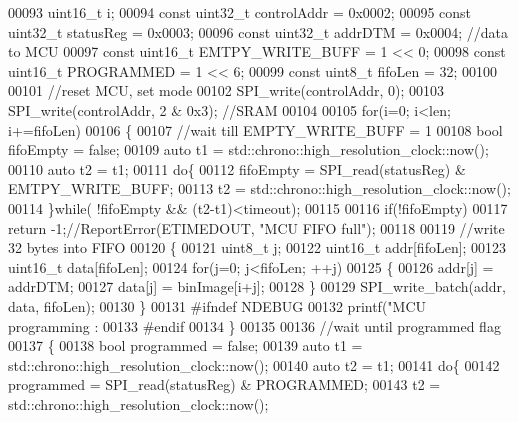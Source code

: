 \begin{DoxyCode}
{{{00093     uint16\_t i;
00094     \textcolor{keyword}{const} uint32\_t controlAddr = 0x0002;
00095     \textcolor{keyword}{const} uint32\_t statusReg = 0x0003;
00096     \textcolor{keyword}{const} uint32\_t addrDTM = 0x0004; \textcolor{comment}{//data to MCU}
00097     \textcolor{keyword}{const} uint16\_t EMTPY\_WRITE\_BUFF = 1 << 0;
00098     \textcolor{keyword}{const} uint16\_t PROGRAMMED = 1 << 6;
00099     \textcolor{keyword}{const} uint8\_t fifoLen = 32;
00100 
00101     \textcolor{comment}{//reset MCU, set mode}
00102     SPI_write(controlAddr, 0);
00103     SPI_write(controlAddr, 2 & 0x3); \textcolor{comment}{//SRAM}
00104 
00105     \textcolor{keywordflow}{for}(i=0; i<len; i+=fifoLen)
00106     \{
00107         \textcolor{comment}{//wait till EMPTY\_WRITE\_BUFF = 1}
00108         \textcolor{keywordtype}{bool} fifoEmpty = \textcolor{keyword}{false};
00109         \textcolor{keyword}{auto} t1 = std::chrono::high\_resolution\_clock::now();
00110         \textcolor{keyword}{auto} t2 = t1;
00111         \textcolor{keywordflow}{do}\{
00112             fifoEmpty = SPI_read(statusReg) & EMTPY\_WRITE\_BUFF;
00113             t2 = std::chrono::high\_resolution\_clock::now();
00114         \}\textcolor{keywordflow}{while}( !fifoEmpty && (t2-t1)<timeout);
00115 
00116         \textcolor{keywordflow}{if}(!fifoEmpty)
00117             \textcolor{keywordflow}{return} -1;\textcolor{comment}{//ReportError(ETIMEDOUT, "MCU FIFO full");}
00118 
00119         \textcolor{comment}{//write 32 bytes into FIFO}
00120         \{
00121             uint8\_t j;
00122             uint16\_t addr[fifoLen];
00123             uint16\_t data[fifoLen];
00124             \textcolor{keywordflow}{for}(j=0; j<fifoLen; ++j)
00125             \{
00126                 addr[j] = addrDTM;
00127                 data[j] = binImage[i+j];
00128             \}
00129             SPI_write_batch(addr, data, fifoLen);
00130         \}
00131 \textcolor{preprocessor}{#ifndef NDEBUG}
00132         printf(\textcolor{stringliteral}{"MCU programming : %
00133 \textcolor{preprocessor}{#endif}
00134     \}
00135 
00136     \textcolor{comment}{//wait until programmed flag}
00137     \{
00138         \textcolor{keywordtype}{bool} programmed = \textcolor{keyword}{false};
00139         \textcolor{keyword}{auto} t1 = std::chrono::high\_resolution\_clock::now();
00140         \textcolor{keyword}{auto} t2 = t1;
00141         \textcolor{keywordflow}{do}\{
00142             programmed = SPI_read(statusReg) & PROGRAMMED;
00143             t2 = std::chrono::high\_resolution\_clock::now();
}}}}
\end{DoxyCode}
